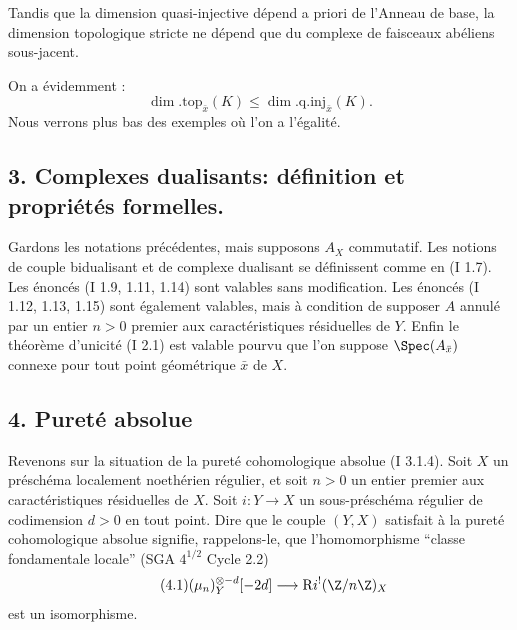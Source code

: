Tandis que la dimension quasi-injective dépend a priori de l'Anneau 
de base, la
dimension topologique stricte ne dépend que du complexe de faisceaux abéliens sous-jacent.

On a évidemment :
\[
        \dim.\mathrm{top}_{\bar{x}}(K)\leq \dim.\mathrm{q.inj}_{\bar{x}}(K).
\]
Nous verrons plus bas des exemples où l'on a l'égalité.

\subsection*{3. Complexes dualisants: définition et propriétés formelles.}

Gardons les notations précédentes, mais supposons $A_X$ commutatif. Les notions de couple bidualisant et de complexe dualisant se définissent comme en (I 1.7). Les énoncés (I 1.9, 1.11, 1.14) sont valables sans modification. Les énoncés (I 1.12, 1.13, 1.15) sont également valables, mais à condition de supposer $A$ annulé par un entier $n>0$ premier aux caractéristiques résiduelles de $Y$. Enfin le théorème d'unicité (I 2.1) est valable pourvu que l'on suppose $\Spec(A_{\bar{x}})$ connexe pour tout point géométrique $\bar{x}$ de $X$.

\subsection*{4. Pureté absolue}

Revenons sur la situation de la pureté cohomologique absolue (I 3.1.4). Soit $X$ un préschéma localement noethérien régulier, et soit $n>0$ un entier premier aux caractéristiques résiduelles de $X$. Soit $i:Y\to X$ un sous-préschéma régulier de codimension $d>0$ en tout point. Dire que le couple $(Y,X)$ satisfait à la pureté cohomologique absolue signifie, rappelons-le, que l'homomorphisme ``classe fondamentale locale'' (SGA $4^{1/2}$ Cycle 2.2)
\begin{equation}\tag{4.1}
        (\mu_n)_Y^{\otimes -d}[-2d]\longrightarrow \mathrm{R} i^!(\Z/n\Z)_X
\end{equation}
est un
isomorphisme.

